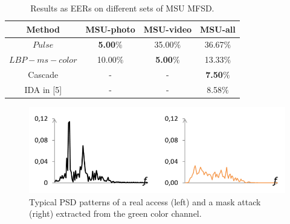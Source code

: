 \documentclass[journal]{IEEEtran}
\begin{document}
\begin{table}[ht]
	\renewcommand{\arraystretch}{1.3}
	\normalsize
	\centering
	\caption{Results as EERs on different sets of MSU MFSD.}
	\label{tab_F_2}
	\begin{tabular}{|c|c|c|c|}
		\hline 
		Method & MSU-photo & MSU-video & MSU-all \\ 
		\hline \hline 
		$Pulse$ & \textbf{5.00$\%$} & 35.00$\%$ & 36.67$\%$ \\ 
		\hline 
		$LBP-ms-color$ & 10.00$\%$ & \textbf{5.00$\%$} & 13.33$\%$ \\ 
		\hline \hline 
		Cascade & - & - & \textbf{7.50$\%$} \\ 
		\hline 
		IDA in [5] & - & - & 8.58$\%$ \\ 
		\hline 
	\end{tabular} 
\end{table}

\begin{figure}[!t]
	\centering
	\includegraphics[width=1\linewidth]{img/F_4}
	\caption{Typical PSD patterns of a real access (left) and a mask attack (right) extracted from the green color channel.}
	\label{fig_F_4}
\end{figure}
\end{document}

